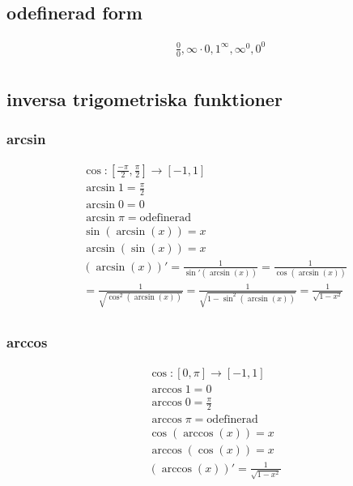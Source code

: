 \begin{multicols}{2}


  \subsection{odefinerad form}
  \begin{align*}
    &\quad  \frac{0}{0},\infty\cdot{0},1^{\infty},\infty^0,0^0 \\
  \end{align*}


  \subsection{inversa trigometriska funktioner}
  \subsubsection{arcsin}
  \begin{align*}
    &\cos: [\frac{-\pi}{2},\frac{\pi}{2}] \to [-1,1] \\
    &\arcsin{1}=\frac{\pi}{2} \\
    &\arcsin{0}=0 \\
    &\arcsin{\pi}=\text{odefinerad} \\
    &\sin(\arcsin(x))=x \\  
    &\arcsin(\sin(x))=x \\
    &(\arcsin(x))'=\frac{1}{\sin'(\arcsin(x))}=\frac{1}{\cos(\arcsin(x))} \\
    &=\frac{1}{\sqrt{\cos^2(\arcsin(x))}}=\frac{1}{\sqrt{1-\sin^2(\arcsin(x))}}=\frac{1}{\sqrt{1-x^2}} \\
  \end{align*}

  \subsubsection{arccos}
  \begin{align*}
    &\cos: [0,\pi] \to [-1,1] \\
    &\arccos{1}=0 \\
    &\arccos{0}=\frac{\pi}{2} \\
    &\arccos{\pi}=\text{odefinerad} \\
    &\cos(\arccos(x))=x \\  
    &\arccos(\cos(x))=x \\
    &(\arccos(x))'= \frac{1}{\sqrt{1-x^2}} \\
  \end{align*}


\end{multicols}
